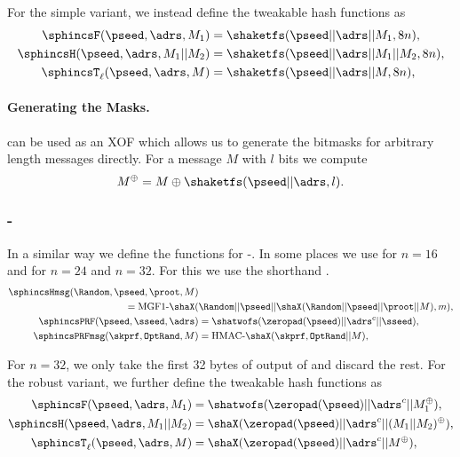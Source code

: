     For the simple variant, we instead define the tweakable hash functions as
    \begin{equation}
      \begin{aligned}
         \sphincsF(\pseed, \adrs, M_1) &= \shaketfs(\pseed || \adrs || M_1, 8n),\\
         \sphincsH(\pseed, \adrs, M_1 || M_2) &= \shaketfs(\pseed || \adrs || M_1 || M_2, 8n),\\
         \sphincsT_\ell(\pseed, \adrs, M) &= \shaketfs(\pseed || \adrs || M, 8n),\\
      \end{aligned}
    \end{equation}

   \paragraph{Generating the Masks.} \shathree can be used as an XOF which 
   allows us to generate the bitmasks for arbitrary length messages directly. 
   For a message $M$ with $l$ bits we compute
   \begin{equation*}
      M^{\oplus} = M \oplus \shaketfs(\pseed || \adrs, l).
   \end{equation*}

\subsubsection{\spx-\shatwo}
   In a similar way we define the functions for \spx-\shatwo. In some places we use \shatwofs for $n = 16$ and \shatwofivetwelve for $n=24$ and $n=32$. For this we use the shorthand \shaX.
   \begin{equation}
   \begin{aligned}
      \sphincsHmsg(\Random,\pseed, \proot, M) &\\
              = \text{MGF1-}\shaX(&\Random || \pseed || \shaX(\Random || \pseed || \proot || M), m),\\
      \sphincsPRF(\pseed, \sseed, \adrs) &= \shatwofs(\zeropad(\pseed)|| \adrs^{c} || \sseed),\\
      \sphincsPRFmsg(\skprf, \texttt{OptRand}, M) &= \text{HMAC-}\shaX(\skprf, \texttt{OptRand} || M),\\
   \end{aligned}
   \end{equation}

   For $n=32$, we only take the first 32 bytes of output of \sphincsPRF and discard the rest. For the robust variant, we further define the tweakable hash functions as
   \begin{equation}
   \begin{aligned}
      \sphincsF(\pseed, \adrs, M_1) &= \shatwofs(\zeropad(\pseed) || \adrs^{c} || M_1^{\oplus}),\\
      \sphincsH(\pseed, \adrs, M_1 || M_2) &= \shaX(\zeropad(\pseed) || \adrs^{c} || (M_1|| M_2)^{\oplus}),\\
      \sphincsT_\ell(\pseed, \adrs, M) &= \shaX(\zeropad(\pseed) || \adrs^{c} || M^{\oplus}),\\
   \end{aligned}
   \end{equation}

